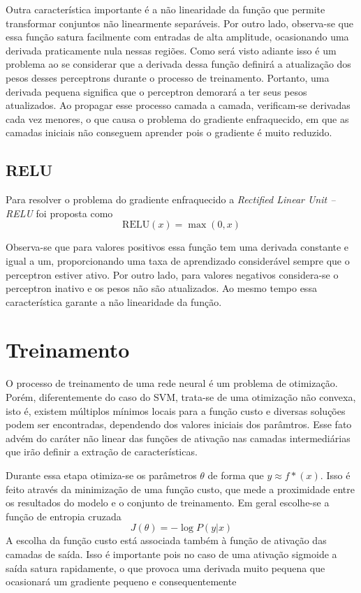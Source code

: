 Outra característica importante é a não linearidade da função que permite transformar conjuntos não linearmente separáveis. Por outro lado, observa-se que essa função satura facilmente com entradas de alta amplitude, ocasionando uma derivada praticamente nula nessas regiões. Como será visto adiante isso é um problema ao se considerar que a derivada dessa função definirá a atualização dos pesos desses perceptrons durante o processo de treinamento. Portanto, uma derivada pequena significa que o perceptron demorará a ter seus pesos atualizados. Ao propagar esse processo camada a camada, verificam-se derivadas cada vez menores, o que causa o problema do gradiente enfraquecido, em que as camadas iniciais não conseguem aprender pois o gradiente é muito reduzido.

\subsection{RELU}
Para resolver o problema do gradiente enfraquecido a \textit{Rectified Linear Unit -- RELU} foi proposta \cite{nair2010relu} como
\begin{equation}
	\label{eq:relu}
	\text{RELU}(x) = \max(0,x)
\end{equation}

Observa-se que para valores positivos essa função tem uma derivada constante e igual a um, proporcionando uma taxa de aprendizado considerável sempre que o perceptron estiver ativo. Por outro lado, para valores negativos considera-se o perceptron inativo e os pesos não são atualizados. Ao mesmo tempo essa característica garante a não linearidade da função.

\section{Treinamento}
O processo de treinamento de uma rede neural é um problema de otimização. Porém, diferentemente do caso do SVM, trata-se de uma otimização não convexa, isto é, existem múltiplos mínimos locais para a função custo e diversas soluções podem ser encontradas, dependendo dos valores iniciais dos parâmtros. Esse fato advém do caráter não linear das funções de ativação nas camadas intermediárias que irão definir a extração de características.

Durante essa etapa otimiza-se os parâmetros $\theta$ de forma que $y \approx f*(x)$. Isso é feito através da minimização de uma função custo, que mede a proximidade entre os resultados do modelo e o conjunto de treinamento. Em geral escolhe-se a função de entropia cruzada
\begin{equation}
J(\theta) = -\log P(y|x)
\end{equation}
A escolha da função custo está associada também à função de ativação das camadas de saída. Isso é importante pois no caso de uma ativação sigmoide a saída satura rapidamente, o que provoca uma derivada muito pequena que ocasionará um gradiente pequeno e consequentemente 

